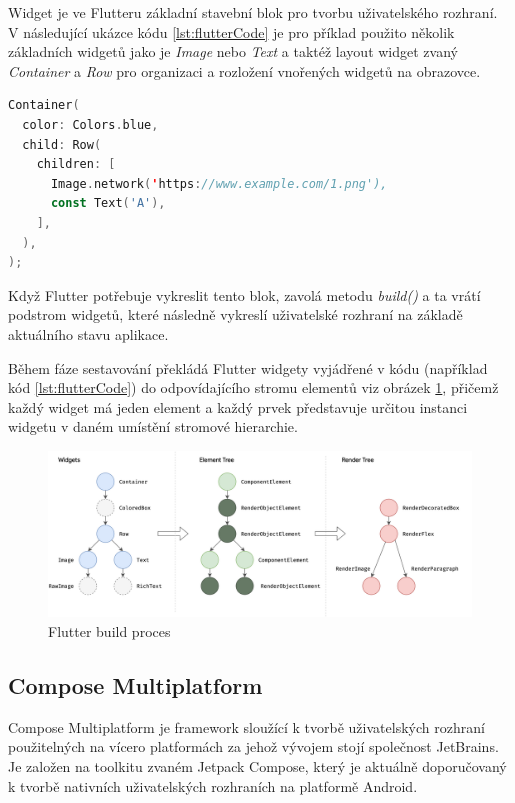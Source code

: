 Widget je ve Flutteru základní stavební blok pro tvorbu uživatelského rozhraní. \cite{flutterWidgets} V následující ukázce kódu \ref{lst:flutterCode} je pro příklad použito několik 
základních widgetů jako je \emph{Image} nebo \emph{Text} a taktéž layout widget zvaný \emph{Container} a \emph{Row} pro organizaci a 
rozložení vnořených widgetů na obrazovce.

\begin{lstlisting}[caption={Popis UI widgetů pomocí jazyka Dart}, label={lst:flutterCode}, language=Kotlin]
  Container(
  color: Colors.blue,
  child: Row(
    children: [
      Image.network('https://www.example.com/1.png'),
      const Text('A'),
    ],
  ),
);
\end{lstlisting}

Když Flutter potřebuje vykreslit tento blok, zavolá metodu \emph{build()} a ta vrátí podstrom widgetů, které následně vykreslí uživatelské 
rozhraní na základě aktuálního stavu aplikace. \cite*{flutterArchOverview}

Během fáze sestavování překládá Flutter widgety vyjádřené v kódu (například kód \ref{lst:flutterCode}) do odpovídajícího stromu elementů viz obrázek \ref{fig:flutter_trees}, přičemž každý widget má jeden element a 
každý prvek představuje určitou instanci widgetu v daném umístění stromové hierarchie. \cite*{flutterArchOverview}


\begin{figure}[H]
  \centering
  \includegraphics[width=1\textwidth]{flutter_trees.png}
  \caption{Flutter build proces}
  \label{fig:flutter_trees}
\end{figure}



\subsection{Compose Multiplatform}

Compose Multiplatform je framework sloužící k tvorbě uživatelských rozhraní použitelných na vícero platformách za 
jehož vývojem stojí společnost JetBrains. \cite{composeMultiplatform} Je založen na toolkitu zvaném Jetpack Compose, který je aktuálně 
doporučovaný k tvorbě nativních uživatelských rozhraních na platformě Android. \cite{jetpack}

